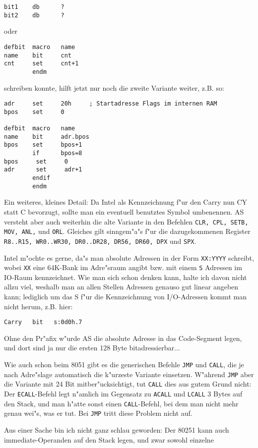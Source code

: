 \documentclass[12pt,a4paper,twoside]{report}
\newcommand{\tty}[1]{{\tt #1}}
\begin{document}
{\begin{verbatim}
bit1    db      ?
bit2    db      ?
\end{verbatim}
oder
\begin{verbatim}
defbit	macro   name
name    bit     cnt
cnt     set     cnt+1
        endm
\end{verbatim}
schreiben konnte, hilft jetzt nur noch die zweite Variante weiter, z.B.
so:
\begin{verbatim}
adr     set     20h     ; Startadresse Flags im internen RAM
bpos    set     0

defbit  macro   name
name    bit     adr.bpos
bpos    set     bpos+1
        if      bpos=8
bpos     set     0
adr      set     adr+1
        endif
        endm
\end{verbatim}
Ein weiteres, kleines Detail: Da Intel als Kennzeichnung f"ur den Carry
nun CY statt C bevorzugt, sollte man ein eventuell benutztes Symbol
umbenennen.  AS versteht aber auch weiterhin die alte Variante in den
Befehlen \tty{CLR, CPL, SETB, MOV, ANL,} und \tty{ORL}.  Gleiches gilt
sinngem"a"s f"ur die dazugekommenen Register \tty{R8..R15, WR0..WR30,
DR0..DR28, DR56, DR60, DPX} und \tty{SPX}.
\par
Intel m"ochte es gerne, da"s man absolute Adressen in der Form \tty{XX:YYYY}
schreibt, wobei \tty{XX} eine 64K-Bank im Adre"sraum angibt bzw. mit einem
\tty{S} Adressen im IO-Raum kennzeichnet.  Wie man sich schon denken kann,
halte ich davon nicht allzu viel, weshalb man an allen Stellen Adressen
genauso gut linear angeben kann; lediglich um das S f"ur die Kennzeichnung
von I/O-Adressen kommt man nicht herum, z.B. hier:
\begin{verbatim}
Carry   bit   s:0d0h.7
\end{verbatim}
Ohne den Pr"afix w"urde AS die absolute Adresse in das Code-Segment
legen, und dort sind ja nur die ersten 128 Byte bitadressierbar...
\par
Wie auch schon beim 8051 gibt es die generischen Befehle \tty{JMP} und
\tty{CALL}, die je nach Adre"slage automatisch die k"urzeste Variante
einsetzen.  W"ahrend \tty{JMP} aber die Variante mit 24 Bit mitber"ucksichtigt,
tut \tty{CALL} dies aus gutem Grund nicht: Der \tty{ECALL}-Befehl legt
n"amlich im Gegensatz zu \tty{ACALL} und \tty{LCALL} 3 Bytes auf den
Stack, und man h"atte sonst einen \tty{CALL}-Befehl, bei dem man nicht
mehr genau wei"s, was er tut.  Bei \tty{JMP} tritt diese Problem nicht auf.
\par
Aus einer Sache bin ich nicht ganz schlau geworden: Der 80251 kann
auch immediate-Operanden auf den Stack legen, und zwar sowohl einzelne
}
\end{document}
